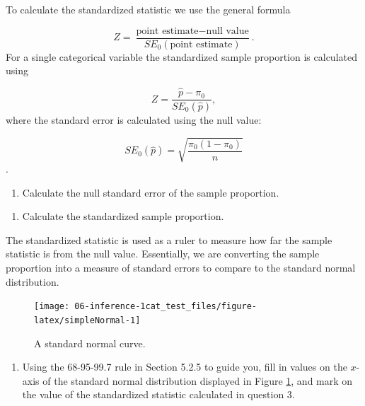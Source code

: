 \documentclass[
]{report}
\providecommand{\tightlist}{%
  \setlength{\itemsep}{0pt}\setlength{\parskip}{0pt}}
\begin{document}
\vspace{1in}

To calculate the standardized statistic we use the general formula

\[
Z = \frac{\text{point estimate} - \text{null value}}{SE_0(\text{point estimate})}.
\]
For a single categorical variable the standardized sample proportion is calculated using

\[
Z = \frac{\hat{p} - \pi_0}{SE_0(\hat{p})},
\]
where the standard error is calculated using the null value:

\[SE_0(\hat{p})=\sqrt{\frac{\pi_0(1-\pi_0)}{n}}\].
\vspace{0.5mm}

\begin{enumerate}
\def\labelenumi{\arabic{enumi}.}
\setcounter{enumi}{1}
\tightlist
\item
  Calculate the null standard error of the sample proportion.
\end{enumerate}

\vspace{1in}

\begin{enumerate}
\def\labelenumi{\arabic{enumi}.}
\setcounter{enumi}{2}
\tightlist
\item
  Calculate the standardized sample proportion.
\end{enumerate}

\vspace{1in}

\newpage

The standardized statistic is used as a ruler to measure how far the sample statistic is from the null value. Essentially, we are converting the sample proportion into a measure of standard errors to compare to the standard normal distribution.

\begin{figure}

{\centering \texttt{[image: 06-inference-1cat\_test\_files/figure-latex/simpleNormal-1]} 

}

\caption{A standard normal curve.}\label{fig:simpleNormal}
\end{figure}

\begin{enumerate}
\def\labelenumi{\arabic{enumi}.}
\setcounter{enumi}{3}
\tightlist
\item
  Using the 68-95-99.7 rule in Section 5.2.5 to guide you, fill in values on the \(x\)-axis of the standard normal distribution displayed in Figure \ref{fig:simpleNormal}, and mark on the value of the standardized statistic calculated in question 3.
\end{enumerate}
\end{document}
